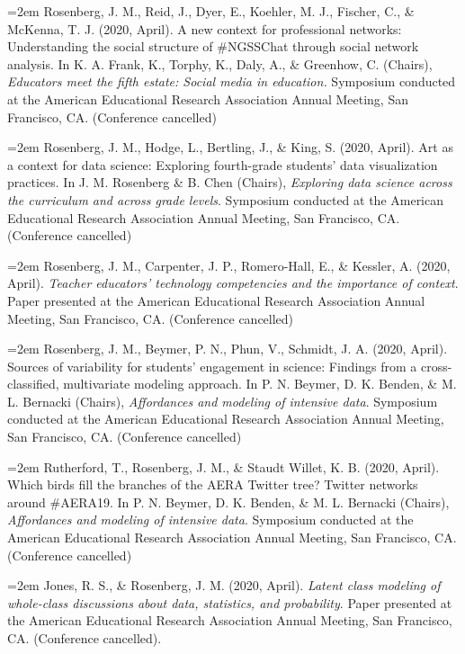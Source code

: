 \documentclass[
  11pt,
]{article}
\begin{document}
\hangindent=2em Rosenberg, J. M., Reid, J., Dyer, E., Koehler, M. J.,
Fischer, C., \& McKenna, T. J. (2020, April). A new context for
professional networks: Understanding the social structure of \#NGSSChat
through social network analysis. In K. A. Frank, K., Torphy, K., Daly,
A., \& Greenhow, C. (Chairs), \emph{Educators meet the fifth estate:
Social media in education.} Symposium conducted at the American
Educational Research Association Annual Meeting, San Francisco, CA.
(Conference cancelled)

\hangindent=2em Rosenberg, J. M., Hodge, L., Bertling, J., \& King, S.
(2020, April). Art as a context for data science: Exploring fourth-grade
students' data visualization practices. In J. M. Rosenberg \& B. Chen
(Chairs), \emph{Exploring data science across the curriculum and across
grade levels}. Symposium conducted at the American Educational Research
Association Annual Meeting, San Francisco, CA. (Conference cancelled)

\hangindent=2em Rosenberg, J. M., Carpenter, J. P., Romero-Hall, E., \&
Kessler, A. (2020, April). \emph{Teacher educators' technology
competencies and the importance of context}. Paper presented at the
American Educational Research Association Annual Meeting, San Francisco,
CA. (Conference cancelled)

\hangindent=2em Rosenberg, J. M., Beymer, P. N., Phun, V., Schmidt, J.
A. (2020, April). Sources of variability for students' engagement in
science: Findings from a cross-classified, multivariate modeling
approach. In P. N. Beymer, D. K. Benden, \& M. L. Bernacki (Chairs),
\emph{Affordances and modeling of intensive data}. Symposium conducted
at the American Educational Research Association Annual Meeting, San
Francisco, CA. (Conference cancelled)

\hangindent=2em Rutherford, T., Rosenberg, J. M., \& Staudt Willet, K.
B. (2020, April). Which birds fill the branches of the AERA Twitter
tree? Twitter networks around \#AERA19. In P. N. Beymer, D. K. Benden,
\& M. L. Bernacki (Chairs), \emph{Affordances and modeling of intensive
data}. Symposium conducted at the American Educational Research
Association Annual Meeting, San Francisco, CA. (Conference cancelled)

\hangindent=2em Jones, R. S., \& Rosenberg, J. M. (2020, April).
\emph{Latent class modeling of whole-class discussions about data,
statistics, and probability}. Paper presented at the American
Educational Research Association Annual Meeting, San Francisco, CA.
(Conference cancelled).
\end{document}
